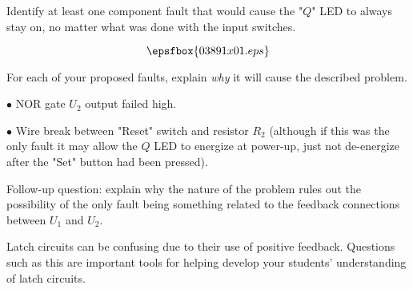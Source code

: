 

Identify at least one component fault that would cause the "$Q$" LED to always stay on, no matter what was done with the input switches.

$$\epsfbox{03891x01.eps}$$

For each of your proposed faults, explain {\it why} it will cause the described problem.







\medskip
\item{$\bullet$} NOR gate $U_2$ output failed high.
\vskip 5pt
\item{$\bullet$} Wire break between "Reset" switch and resistor $R_2$ (although if this was the only fault it may allow the $Q$ LED to energize at power-up, just not de-energize after the "Set" button had been pressed).
\medskip

\vskip 10pt

Follow-up question: explain why the nature of the problem rules out the possibility of the only fault being something related to the feedback connections between $U_1$ and $U_2$.







Latch circuits can be confusing due to their use of positive feedback.  Questions such as this are important tools for helping develop your students' understanding of latch circuits.




